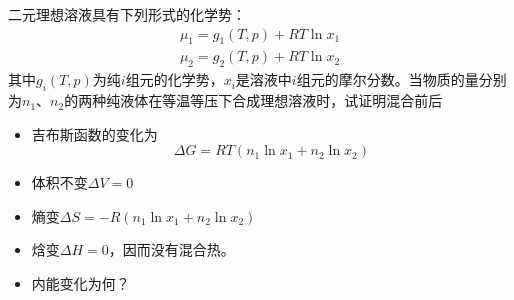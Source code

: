 \documentclass[12pt,a4paper]{article}
\newenvironment{problem}[2][Problem]{\begin{trivlist}
\item[\hskip \labelsep {\bfseries #1}\hskip \labelsep {\bfseries #2.}]}{\end{trivlist}}
\begin{document}
\begin{problem}{4.3}
二元理想溶液具有下列形式的化学势：
\begin{gather*}
\mu_1=g_1(T,p)+RT\ln x_1\\
\mu_2=g_2(T,p)+RT\ln x_2
\end{gather*}
其中$g_i(T,p)$为纯$i$组元的化学势，$x_i$是溶液中$i$组元的摩尔分数。当物质的量分别为$n_1$、$n_2$的两种纯液体在等温等压下合成理想溶液时，试证明混合前后
\begin{itemize}
\item[（a）] 吉布斯函数的变化为
\[
\Delta G=RT(n_1\ln x_1+n_2\ln x_2)
\]
\item[（b）] 体积不变$\Delta V=0$
\item[（c）] 熵变$\Delta S=-R(n_1\ln x_1+n_2\ln x_2)$
\item[（d）] 焓变$\Delta H=0$，因而没有混合热。
\item[（e）] 内能变化为何？
\end{itemize}
\end{problem}
\end{document}
